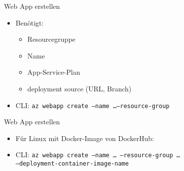 \begin{flashcard}[Definition]{Web App erstellen}
    \begin{itemize}
        \item Benötigt:
        \begin{itemize}
            \item Resourcegruppe
            \item Name
            \item App-Service-Plan
            \item deployment source (URL, Branch)
        \end{itemize}
        \item CLI: \texttt{az webapp create --name \ldots --resource-group}
    \end{itemize}
\end{flashcard}



\begin{flashcard}[Definition]{Web App erstellen}
    \begin{itemize}
        \item Für Linux mit Docker-Image von DockerHub:
        \item CLI: \texttt{az webapp create --name \ldots\ --resource-group \ldots\ \\--deployment-container-image-name}
    \end{itemize}
\end{flashcard}


